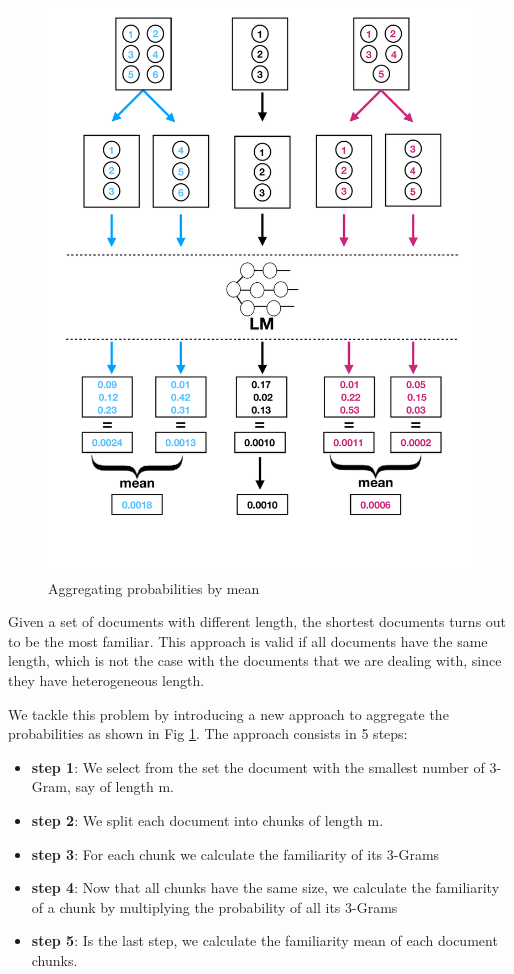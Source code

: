 \documentclass[12pt,mscthesis]{usiinfthesis}
\begin{document}
			\begin{figure}[htbp]
			\centering
			\includegraphics[width=\textwidth]{aggregation-by-mean}
			\caption{Aggregating probabilities by mean}
			\label{aggregation-by-mean}
			\end{figure}
		
		Given a set of documents with different length, the shortest documents turns out to be the most familiar. This approach is valid if all documents have the same length, which is not the case with the documents that we are dealing with, since they have heterogeneous length. 


		We tackle this problem by introducing a new approach to aggregate the probabilities as shown in Fig \ref{aggregation-by-mean}.
		The approach consists in 5 steps: 
		\begin{itemize}
			\item \textbf{step 1}: We select from the set the document with the smallest number of 3-Gram, say of length m.
			\item \textbf{step 2}: We split each document into chunks of length m.
			\item \textbf{step 3}: For each chunk we calculate the familiarity of its 3-Grams
			\item \textbf{step 4}: Now that all chunks have the same size, we calculate the familiarity of a chunk by multiplying the probability of all its 3-Grams
			\item \textbf{step 5}: Is the last step, we calculate the familiarity mean of each document chunks.
		\end{itemize}
\end{document}
